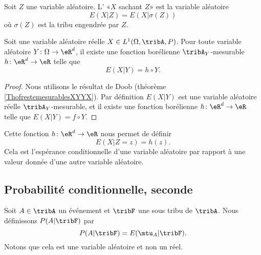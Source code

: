 \begin{definition}
    Soit \( Z\) une variable aléatoire. L' «\( X\) sachant \( Z\)» est la variable aléatoire
    \begin{equation}
        E(X|Z)=E(X|\sigma(Z))
    \end{equation}
    où \( \sigma(Z)\) est la tribu engendrée par \( Z\).
\end{definition}

\begin{proposition}
    Soit une variable aléatoire réelle \( X\in L^1(\Omega,\tribA,P)\). Pour toute variable aléatoire \( Y\colon \Omega\to \eR^d\), il existe une fonction borélienne \( \tribA_Y\)-mesurable \( h\colon \eR^d\to \eR\) telle que
    \begin{equation}
        E(X|Y)=h\circ Y.
    \end{equation}
\end{proposition}

\begin{proof}
    Nous utilisons le résultat de Doob (théorème \ref{ThofrestemesurablesXYYX}). Par définition \( E(X|Y)\) est une variable aléatoire réelle \( \tribA_Y\)-mesurable, et il existe une fonction borélienne \( h\colon \eR^d\to \eR\) telle que \( E(X|Y)=f\circ Y\).
\end{proof}

Cette fonction \( h\colon \eR^d\to \eR\) nous permet de définir
\begin{equation}
    E(X|Z=z)=h(z).
\end{equation}
Cela est l'espérance conditionnelle d'une variable aléatoire par rapport à une valeur donnée d'une autre variable aléatoire.

\subsection{Probabilité conditionnelle, seconde}

Soit \( A\in\tribA\) un événement et \( \tribF\) une sous tribu de \( \tribA\). Nous définissons \( P(A|\tribF)\) par
\begin{equation}
    P(A|\tribF)=E(\mtu_{A}|\tribF).
\end{equation}
Notons que cela est une variable aléatoire et non un réel.

